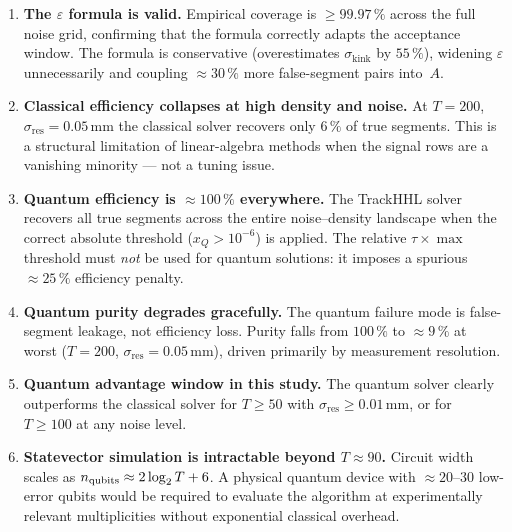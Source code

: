 \documentclass[11pt,a4paper]{article}
\newcommand{\eps}{\varepsilon}
\newcommand{\sres}{\sigma_{\mathrm{res}}}
\newcommand{\srkink}{\sigma_{\mathrm{kink}}}
\newcommand{\ntrk}{T}
\begin{document}
\begin{enumerate}

  \item \textbf{The $\varepsilon$ formula is valid.}
        Empirical coverage is $\geq\!99.97\,\%$ across the full noise grid, confirming
        that the formula correctly adapts the acceptance window.  The formula is
        conservative (overestimates $\srkink$ by $55\,\%$), widening $\eps$
        unnecessarily and coupling $\approx\!30\,\%$ more false-segment pairs into~$A$.

  \item \textbf{Classical efficiency collapses at high density and noise.}
        At $\ntrk=200$, $\sres=0.05\,\mathrm{mm}$ the classical solver recovers only
        $6\,\%$ of true segments.  This is a structural limitation of linear-algebra
        methods when the signal rows are a vanishing minority --- not a tuning issue.

  \item \textbf{Quantum efficiency is $\approx\!100\,\%$ everywhere.}
        The TrackHHL solver recovers all true segments across the entire noise--density
        landscape when the correct absolute threshold ($x_Q>10^{-6}$) is applied.  The
        relative $\tau\times\max$ threshold must \emph{not} be used for quantum
        solutions: it imposes a spurious $\approx\!25\,\%$ efficiency penalty.

  \item \textbf{Quantum purity degrades gracefully.}
        The quantum failure mode is false-segment leakage, not efficiency loss.  Purity
        falls from $100\,\%$ to $\approx\!9\,\%$ at worst ($\ntrk=200$,
        $\sres=0.05\,\mathrm{mm}$), driven primarily by measurement resolution.

  \item \textbf{Quantum advantage window in this study.}
        The quantum solver clearly outperforms the classical solver for $\ntrk\geq50$
        with $\sres\geq0.01\,\mathrm{mm}$, or for $\ntrk\geq100$ at any noise level.

  \item \textbf{Statevector simulation is intractable beyond $\ntrk\approx90$.}
        Circuit width scales as $n_{\rm qubits}\approx2\log_2\ntrk+6$.  A physical
        quantum device with $\approx\!20$--$30$ low-error qubits would be required to
        evaluate the algorithm at experimentally relevant multiplicities without
        exponential classical overhead.


\end{enumerate}
\end{document}
